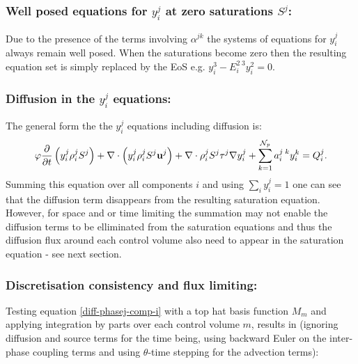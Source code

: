 \subsubsection{Well posed equations for $y_i^j$ at zero saturations $S^j$:}
Due to the presence of the terms involving $\alpha^{jk}$ the systems of
equations for $y_i^j$ always remain well posed. When the saturations
become zero then the resulting equation set is simply replaced by the
EoS e.g. $y_i^3 - E_i^{2\;3} y_i^2 = 0$.

\subsubsection{Diffusion in the $y_i^j$ equations:}
The general form the the $y_i^j$ equations including diffusion is:
\begin{eqnarray}
\phi  \displaystyle\frac{\partial}{\partial t}\left(y_{i}^{j}\rho_i^{j}S^{j} \right) +
\nabla\cdot\left(y_{i}^{j}\rho_i^{j}S^{j}\mathbf{u}^{j}  \right)
+ \nabla \cdot \rho_i^{j}S^{j} \tau^j \nabla y_i^j
+ \sum_{k=1}^{{\cal N}_p} a_i^{j\;k} y_i^k   = Q_i^j.
\label{diff-phasej-comp-i}
\end{eqnarray}
Summing this equation over all components $i$ and using $\sum_i y_i^j=1$ one
can see that the diffusion term disappears from the
resulting saturation equation. However, for space and or time
limiting the summation may not enable the diffusion terms to
be elliminated from the saturation equations
and thus the diffusion
flux around each control volume also need to appear in the
saturation equation - see next section.

\subsubsection{Discretisation consistency and flux limiting:}

Testing equation \ref{diff-phasej-comp-i} with a top hat basis
function $M_m$ and applying integration by parts over each control volume $m$,
results in (ignoring diffusion and source terms for the time being, using backward Euler on the inter-phase coupling terms and using $\theta$-time stepping for the advection terms):


